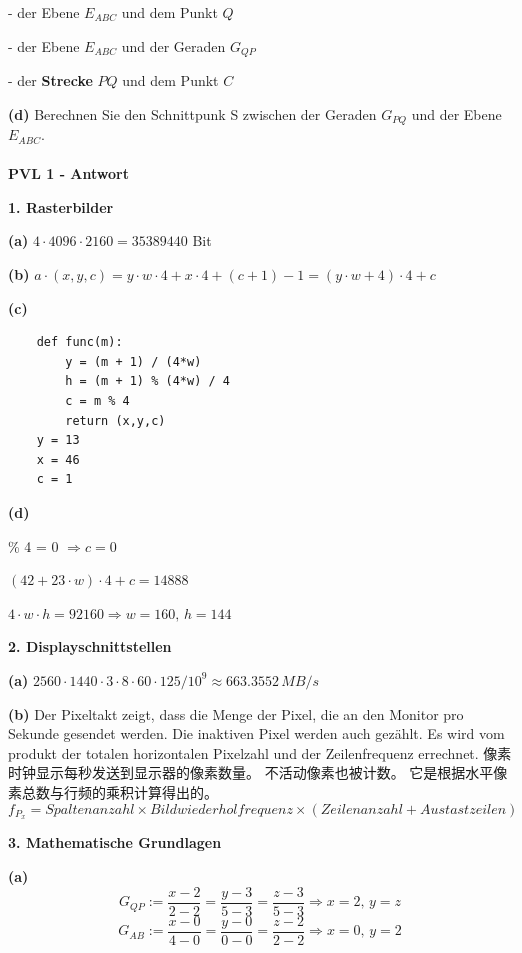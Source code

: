 \documentclass[fleqn]{article}
\begin{document}
\indent\indent- der Ebene $E_{ABC}$ und dem Punkt $Q$ 

\indent\indent- der Ebene $E_{ABC}$ und der Geraden $G_{QP}$ 

\indent\indent- der \textbf{Strecke} $PQ$ und dem Punkt $C$

\indent\textbf{(d)} Berechnen Sie den Schnittpunk S zwischen der Geraden $G_{PQ}$ und der Ebene $E_{ABC}$.
\\
\\
\noindent\textbf{PVL 1 - Antwort}

\indent\textbf{1. Rasterbilder}

\indent\indent\textbf{(a)} $4\cdot 4096\cdot 2160 = 35389440$ Bit

\indent\indent\textbf{(b)} $a\cdot (x,y,c) = y\cdot w\cdot 4+x\cdot 4+(c+1)-1=(y\cdot w+4)\cdot 4 + c$

\indent\indent\textbf{(c)}
\begin{lstlisting}
    def func(m): 
        y = (m + 1) / (4*w) 
        h = (m + 1) % (4*w) / 4 
        c = m % 4 
        return (x,y,c)
    y = 13 
    x = 46 
    c = 1
\end{lstlisting}

\indent\indent\textbf{(d)}

\indent\indent{}\% 4 = 0 $\Rightarrow c=0$

\indent\indent\indent$(42+23\cdot w)\cdot 4 +c=14888$

\indent\indent\indent$4\cdot w\cdot h=92160\Rightarrow w=160,\,h=144$

\indent\textbf{2. Displayschnittstellen}

\indent\indent\textbf{(a)} $2560\cdot 1440\cdot 3\cdot 8\cdot 60\cdot 125/10^9 \approx 663.3552\, MB/s$

\indent\indent\textbf{(b)} Der Pixeltakt zeigt, dass die Menge der Pixel, die an den Monitor pro Sekunde gesendet werden. Die inaktiven Pixel werden auch gezählt. Es wird vom produkt der totalen horizontalen Pixelzahl und der Zeilenfrequenz errechnet.
像素时钟显示每秒发送到显示器的像素数量。 不活动像素也被计数。 它是根据水平像素总数与行频的乘积计算得出的。
$$f_{P_x}=Spaltenanzahl \times Bildwiederholfrequenz \times (Zeilenanzahl + Austastzeilen)$$

\indent\textbf{3. Mathematische Grundlagen}

\indent\indent\textbf{(a)} 
$$G_{QP} :=\frac{x-2}{2-2}=\frac{y-3}{5-3}=\frac{z-3}{5-3}\Rightarrow x=2,\,y=z$$
$$G_{AB} :=\frac{x-0}{4-0}=\frac{y-0}{0-0}=\frac{z-2}{2-2}\Rightarrow x=0,\,y=2$$
\end{document}
